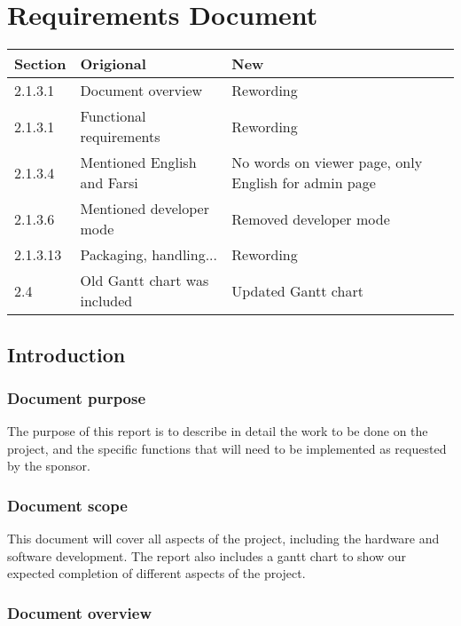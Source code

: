 \documentclass[onecolumn, draftclsnofoot,10pt, compsoc]{IEEEtran}
\begin{document}
\section{Requirements Document}
\begin{center}
 \begin{tabular}{||p{1cm} p{7cm} p{7cm}||} 
 \hline
 Section & Origional & New\\ [0.5ex] 
 \hline\hline
 2.1.3.1 & Document overview & Rewording\\
 \hline
 2.1.3.1 & Functional requirements & Rewording \\ 
 \hline
 2.1.3.4 & Mentioned English and Farsi & No words on viewer page, only English for admin page \\ 
 \hline
 2.1.3.6 & Mentioned developer mode & Removed developer mode \\ 
 \hline
  2.1.3.13 & Packaging, handling... & Rewording \\ 
 \hline
 2.4 & Old Gantt chart was included & Updated Gantt chart \\[1ex] 
 \hline
\end{tabular}
\end{center}
\subsection{Introduction}
    \subsubsection{Document purpose}
    The purpose of this report is to describe in detail the work to be done on the project, and the specific functions that will need to be implemented as requested by the sponsor.

    \subsubsection{Document scope}
    This document will cover all aspects of the project, including the hardware and software development.
    The report also includes a gantt chart to show our expected completion of different aspects of the project.
    
    \subsubsection{Document overview}
    
\end{document}
